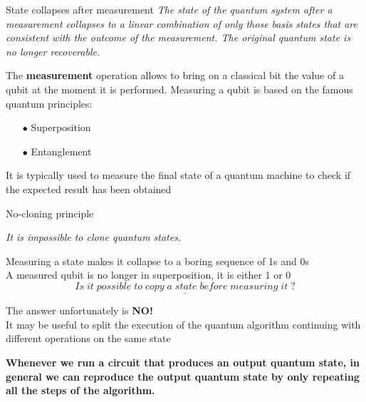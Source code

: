 		\begin{frame}{State collapses after measurement}
			\small
			\emph{The state of the quantum system after a measurement collapses to a linear combination of only those basis states that are consistent with the outcome of the measurement. The original quantum state is no longer recoverable.}
			
			\vspace{0.3cm}
			
			\begin{minipage}{0.6\textwidth}
				The \textbf{measurement} operation allows to bring on a classical bit the value of a qubit at the moment it is performed. Measuring a qubit is based on the famous quantum principles:
				\begin{itemize}
					\item[$\bullet$] Superposition
					\item[$\bullet$] Entanglement
				\end{itemize}
				It is typically used to measure the final state of a quantum machine to check if the expected result has been obtained
			\end{minipage}\hfill
		\end{frame}
	
		\begin{frame}{No-cloning principle}
			\small
			\begin{center}
				\vspace{-1cm}
				\emph{It is impossible to clone quantum states.}
			\end{center}
		
			\vspace{0.3cm}
		
			Measuring a state makes it collapse to a boring sequence of 1s and 0s\\
			A measured qubit is no longer in superposition, it is either 1 or 0 \\
			\begin{equation*}
				\underline{Is\;it\;possible\;to\;copy\;a\;state\;before\;measuring\;it\;?}
			\end{equation*}
			
			\vspace{0.3cm}
			
			The answer unfortunately is \textbf{NO!}\\
			It may be useful to split the execution of the quantum algorithm continuing with different operations on the same state
			
			\vspace{0.3cm}
			
			\textbf{Whenever we run a circuit that produces an output quantum state, in general we can reproduce the output quantum state by only repeating all the steps of the algorithm.}
		\end{frame}
	
